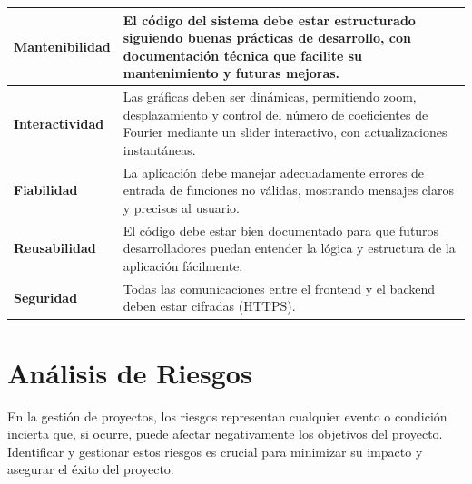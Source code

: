 \begin{longtable}{|m{5cm}|m{8.5cm}|}
	\textbf{Mantenibilidad}  & El código del sistema debe estar estructurado siguiendo buenas prácticas de desarrollo, con documentación técnica que facilite su mantenimiento y futuras mejoras. \\ \hline
	
	\textbf{Interactividad} & Las gráficas deben ser dinámicas, permitiendo zoom, desplazamiento y control del número de coeficientes de Fourier mediante un slider interactivo, con actualizaciones instantáneas. \\ \hline
	
	\textbf{Fiabilidad} & La aplicación debe manejar adecuadamente errores de entrada de funciones no válidas, mostrando mensajes claros y precisos al usuario. \\ \hline
	
	\textbf{Reusabilidad} &  El código debe estar bien documentado para que futuros desarrolladores puedan entender la lógica y estructura de la aplicación fácilmente. \\
	\hline
	
	\textbf{Seguridad} & Todas las comunicaciones entre el frontend y el backend deben estar cifradas (HTTPS). \\
	\hline
\end{longtable}
\caption{Tabla de requerimientos no funcionales} \label{tabla:RNF}
\vspace{0.5cm}



\section{Análisis de Riesgos}
En la gestión de proyectos, los riesgos representan cualquier evento o condición incierta que, si ocurre, puede afectar negativamente los objetivos del proyecto. Identificar y gestionar estos riesgos es crucial para minimizar su impacto y asegurar el éxito del proyecto. 
